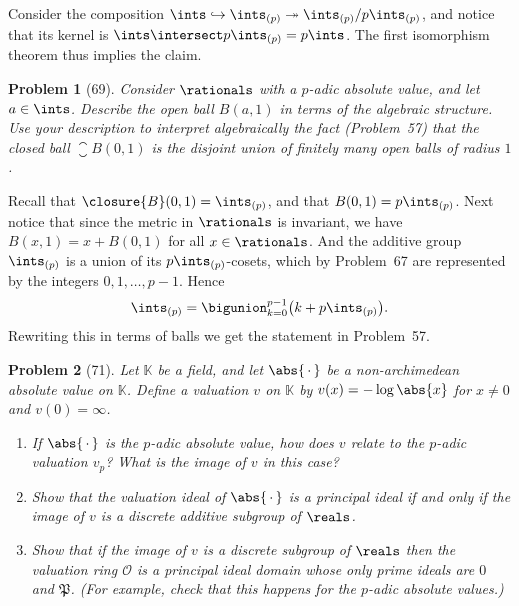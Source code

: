 \documentclass[a4paper, 11pt]{memoir}
\theoremstyle{plaincustomnumber}
\newtheorem{problem}{Problem}
\theoremstyle{changedotbreakcustomnumber}
\newcommand{\calO}{\mathcal{O}}
\newcommand{\fieldK}{\mathbb{K}}
\begin{document}
\begin{solution}
    Consider the composition $\ints \hookrightarrow \ints_{(p)} \twoheadrightarrow \ints_{(p)} / p\ints_{(p)}$, and notice that its kernel is $\ints \intersect p\ints_{(p)} = p\ints$. The first isomorphism theorem thus implies the claim.
\end{solution}


\begin{problem}[69]
    Consider $\rationals$ with a $p$-adic absolute value, and let $a \in \ints$. Describe the open ball $B(a,1)$ in terms of the algebraic structure. Use your description to interpret algebraically the fact (Problem~57) that the closed ball $\closure{B}(0,1)$ is the disjoint union of finitely many open balls of radius $1$.
\end{problem}

\begin{solution}
    Recall that $\closure{B}(0,1) = \ints_{(p)}$, and that $B(0,1) = p\ints_{(p)}$. Next notice that since the metric in $\rationals$ is invariant, we have $B(x,1) = x + B(0,1)$ for all $x \in \rationals$. And the additive group $\ints_{(p)}$ is a union of its $p\ints_{(p)}$-cosets, which by Problem~67 are represented by the integers $0,1,\ldots,p-1$. Hence
    \begin{equation*}
        \ints_{(p)}
            = \bigunion_{k=0}^{p-1} \bigl( k + p\ints_{(p)} \bigr).
    \end{equation*}
    Rewriting this in terms of balls we get the statement in Problem~57.
\end{solution}

\newcommand{\frakP}{\mathfrak{P}}

\begin{problem}[71]
    Let $\fieldK$ be a field, and let $\abs{\,\cdot\,}$ be a non-archimedean absolute value on $\fieldK$. Define a valuation $v$ on $\fieldK$ by $v(x) = -\log\abs{x}$ for $x \neq 0$ and $v(0) = \infty$.
    \begin{enumerate}
        \item If $\abs{\,\cdot\,}$ is the $p$-adic absolute value, how does $v$ relate to the $p$-adic valuation $v_p$? What is the image of $v$ in this case?

        \item Show that the valuation ideal of $\abs{\,\cdot\,}$ is a principal ideal if and only if the image of $v$ is a discrete additive subgroup of $\reals$.
        
        \item Show that if the image of $v$ is a discrete subgroup of $\reals$ then the valuation ring $\calO$ is a principal ideal domain whose only prime ideals are $0$ and $\frakP$. (For example, check that this happens for the $p$-adic absolute values.)
    \end{enumerate}
\end{problem}
\end{document}
